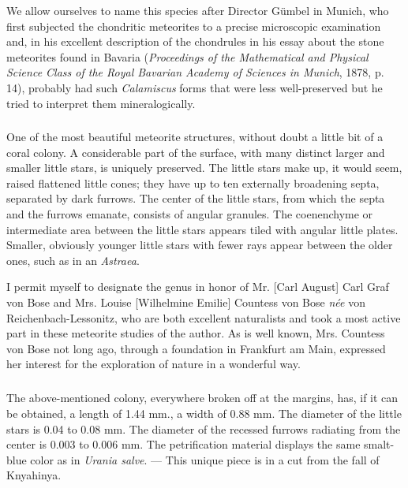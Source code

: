 \documentclass[a4paper, 12pt, oneside]{article}
\begin{document}
We allow ourselves to name this species after Director Gümbel in Munich, who first subjected the chondritic meteorites to a precise microscopic examination and, in his excellent description of the chondrules in his essay about the stone meteorites found in Bavaria (\emph{Proceedings of the Mathematical and Physical Science Class of the Royal Bavarian Academy of Sciences in Munich}, 1878, p. 14), probably had such \emph{Calamiscus} forms that were less well-preserved but he tried to interpret them mineralogically.
\subsubsection{}
\paragraph*{}
One of the most beautiful meteorite structures, without doubt a little bit of a coral colony. A considerable part of the surface, with many distinct larger and smaller little stars, is uniquely preserved. The little stars make up, it would seem, raised flattened little cones; they have up to ten externally broadening septa, separated by dark furrows. The center of the little stars, from which the septa and the furrows emanate, consists of angular granules. The coenenchyme or intermediate area between the little stars appears tiled with angular little plates. Smaller, obviously younger little stars with fewer rays appear between the older ones, such as in an \emph{Astraea}.

I permit myself to designate the genus in honor of Mr. [Carl August] Carl Graf von Bose and Mrs. Louise [Wilhelmine Emilie] Countess von Bose \emph{née} von Reichenbach-Lessonitz, who are both excellent naturalists and took a most active part in these meteorite studies of the author. As is well known, Mrs. Countess von Bose not long ago, through a foundation in Frankfurt am Main, expressed her interest for the exploration of nature in a wonderful way.
\paragraph{\large{}}
\subparagraph{}
The above-mentioned colony, everywhere broken off at the margins, has, if it can be obtained, a length of 1.44 mm., a width of 0.88 mm. The diameter of the little stars is 0.04 to 0.08 mm. The diameter of the recessed furrows radiating from the center is 0.003 to 0.006 mm. The petrification material displays the same smalt-blue color as in \emph{Urania salve}. --- This unique piece is in a cut from the fall of Knyahinya.
\clearpage
\end{document}
